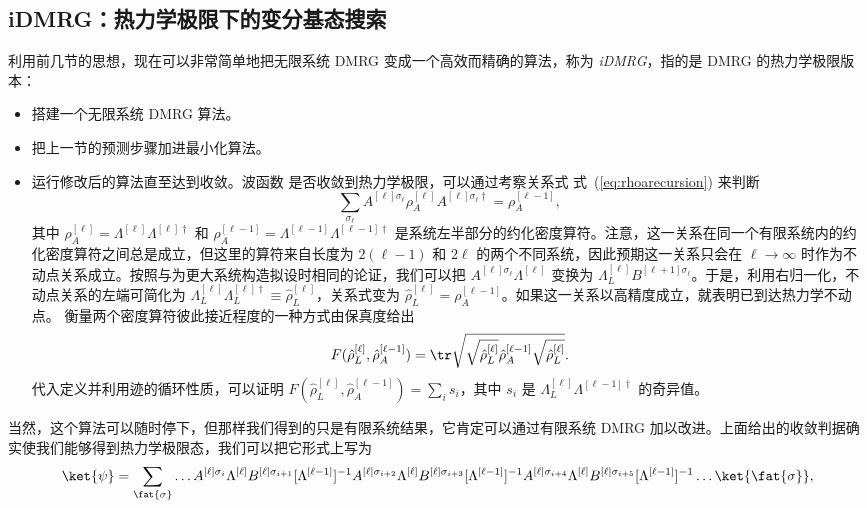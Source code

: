 \subsection{iDMRG：热力学极限下的变分基态搜索}
利用前几节的思想，现在可以非常简单地把无限系统 DMRG 变成一个高效而精确的算法，称为 {\em iDMRG}，指的是 DMRG 的热力学极限版本：
\begin{itemize}
\item 搭建一个无限系统 DMRG 算法。
\item 把上一节的预测步骤加进最小化算法。
\item 运行修改后的算法直至达到收敛。波函数
是否收敛到热力学极限，可以通过考察关系式 式~(\ref{eq:rhoarecursion}) 来判断
\begin{equation}
\sum_{\sigma_\ell} A^{[\ell]\sigma_\ell} \rho_A^{[\ell]} A^{[\ell]\sigma_\ell\dagger} = \rho_A^{[\ell-1]} ,
\end{equation}
其中 $\rho_A^{[\ell]} = \Lambda^{[\ell]}\Lambda^{[\ell]\dagger}$ 和 $\rho_A^{[\ell-1]} = \Lambda^{[\ell-1]}\Lambda^{[\ell-1]\dagger}$ 是系统左半部分的约化密度算符。注意，这一关系在同一个有限系统内的约化密度算符之间总是成立，但这里的算符来自长度为 $2(\ell-1)$ 和 $2\ell$ 的两个不同系统，因此预期这一关系只会在 $\ell\rightarrow\infty$ 时作为不动点关系成立。按照与为更大系统构造拟设时相同的论证，我们可以把 $A^{[\ell]\sigma_\ell}\Lambda^{[\ell]}$ 变换为 $\Lambda^{[\ell]}_L B^{[\ell+1]\sigma_\ell}$。于是，利用右归一化，不动点关系的左端可简化为 $\Lambda^{[\ell]}_L\Lambda^{[\ell]\dagger}_L \equiv \hat{\rho}^{[\ell]}_L$，关系式变为 $\hat{\rho}^{[\ell]}_L = \rho_A^{[\ell-1]}$。如果这一关系以高精度成立，就表明已到达热力学不动点。  
衡量两个密度算符彼此接近程度的一种方式由保真度给出 \cite{McCulloch08}
\begin{equation}
F(\hat{\rho}^{[\ell]}_L, \hat{\rho}_A^{[\ell-1]}) = \tr \sqrt{\sqrt{\hat{\rho}^{[\ell]}_L}\hat{\rho}_A^{[\ell-1]} \sqrt{\hat{\rho}^{[\ell]}_L}} .
\end{equation}
代入定义并利用迹的循环性质，可以证明 $F(\hat{\rho}^{[\ell]}_L, \hat{\rho}^{[\ell-1]}_A) = \sum_i s_i$，其中 $s_i$ 是  $\Lambda^{[\ell]}_L \Lambda^{[\ell-1]\dagger}$ 的奇异值。 
\end{itemize}
当然，这个算法可以随时停下，但那样我们得到的只是有限系统结果，它肯定可以通过有限系统 DMRG 加以改进。上面给出的收敛判据确实使我们能够得到热力学极限态，我们可以把它形式上写为
\begin{equation}
\ket{\psi} = \sum_{\fat{\sigma}} \ldots A^{[\ell]\sigma_i}\Lambda^{[\ell]} B^{[\ell]\sigma_{i+1}} [\Lambda^{[\ell-1]}]^{-1}A^{[\ell]\sigma_{i+2}}\Lambda^{[\ell]} B^{[\ell]\sigma_{i+3}} [\Lambda^{[\ell-1]}]^{-1}A^{[\ell]\sigma_{i+4}}\Lambda^{[\ell]} B^{[\ell]\sigma_{i+5}} [\Lambda^{[\ell-1]}]^{-1} \ldots 
 \ket{\fat{\sigma}} ,
\end{equation}
